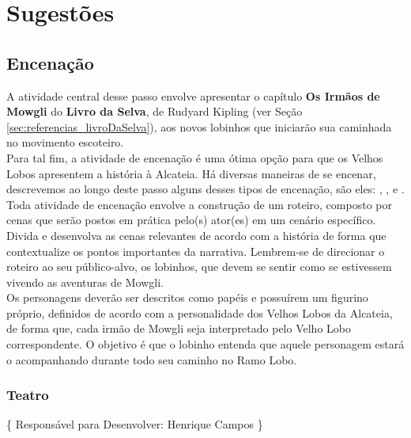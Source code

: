 \chapter[Sugestões]{Sugestões}
\label{chap:sugestoes}
	\section[Encenação]{Encenação}
	\label{sec:sugestoes_encenacao}
		A atividade central desse passo envolve apresentar o capítulo \textbf{Os Irmãos de Mowgli} do \textbf{Livro da Selva}, de Rudyard Kipling (ver Seção \ref{sec:referencias_livroDaSelva}), aos novos lobinhos que iniciarão sua caminhada no movimento escoteiro.
		\\ \indent Para tal fim, a atividade de encenação é uma ótima opção para que os Velhos Lobos apresentem a história à Alcateia. Há diversas maneiras de se encenar, descrevemos ao longo deste passo alguns desses tipos de encenação, são eles: , ,  e .
		\\ \indent Toda atividade de encenação envolve a construção de um roteiro, composto por cenas que serão postos em prática pelo(s) ator(es) em um cenário específico.
		\\ \indent Divida e desenvolva as cenas relevantes de acordo com a história de forma que contextualize os pontos importantes da narrativa. Lembrem-se de direcionar o roteiro ao seu público-alvo, os lobinhos, que devem se sentir como se estivessem vivendo as aventuras de Mowgli.
		\\ \indent Os personagens deverão ser descritos como papéis e possuírem um figurino próprio, definidos de acordo com a personalidade dos Velhos Lobos da Alcateia, de forma que, cada irmão de Mowgli seja interpretado pelo Velho Lobo correspondente. O objetivo é que o lobinho entenda que aquele personagem estará o acompanhando durante todo seu caminho no Ramo Lobo.

		\subsection[Teatro]{Teatro}
		\label{subsec:sugestoes_encenacao_teatro}
			\{ Responsável para Desenvolver: Henrique Campos \}

